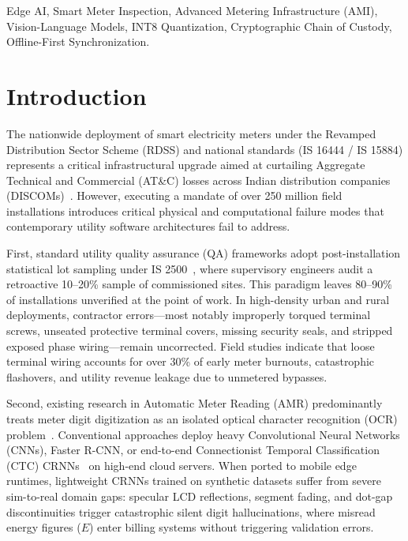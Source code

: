 \documentclass[conference]{IEEEtran}
\begin{document}
\begin{IEEEkeywords}
Edge AI, Smart Meter Inspection, Advanced Metering Infrastructure (AMI), Vision-Language Models, INT8 Quantization, Cryptographic Chain of Custody, Offline-First Synchronization.
\end{IEEEkeywords}

\section{Introduction}
The nationwide deployment of smart electricity meters under the Revamped Distribution Sector Scheme (RDSS) and national standards (IS 16444 / IS 15884) represents a critical infrastructural upgrade aimed at curtailing Aggregate Technical and Commercial (AT\&C) losses across Indian distribution companies (DISCOMs)~\cite{cea2021rdss, bis16444}. However, executing a mandate of over 250 million field installations introduces critical physical and computational failure modes that contemporary utility software architectures fail to address.

First, standard utility quality assurance (QA) frameworks adopt post-installation statistical lot sampling under IS 2500~\cite{bis2500}, where supervisory engineers audit a retroactive 10--20\% sample of commissioned sites. This paradigm leaves 80--90\% of installations unverified at the point of work. In high-density urban and rural deployments, contractor errors---most notably improperly torqued terminal screws, unseated protective terminal covers, missing security seals, and stripped exposed phase wiring---remain uncorrected. Field studies indicate that loose terminal wiring accounts for over 30\% of early meter burnouts, catastrophic flashovers, and utility revenue leakage due to unmetered bypasses.

Second, existing research in Automatic Meter Reading (AMR) predominantly treats meter digit digitization as an isolated optical character recognition (OCR) problem~\cite{laroca2019convolutional, salomon2020deep}. Conventional approaches deploy heavy Convolutional Neural Networks (CNNs), Faster R-CNN, or end-to-end Connectionist Temporal Classification (CTC) CRNNs~\cite{shi2016end} on high-end cloud servers. When ported to mobile edge runtimes, lightweight CRNNs trained on synthetic datasets suffer from severe sim-to-real domain gaps: specular LCD reflections, segment fading, and dot-gap discontinuities trigger catastrophic silent digit hallucinations, where misread energy figures ($E$) enter billing systems without triggering validation errors.
\end{document}

